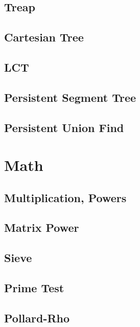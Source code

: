 \subsection{Treap}
\raggedbottom
\hrulefill
\subsection{Cartesian Tree}
\raggedbottom
\hrulefill
\subsection{LCT}
\raggedbottom
\hrulefill
\subsection{Persistent Segment Tree}
\raggedbottom
\hrulefill
\subsection{Persistent Union Find}
\raggedbottom
\hrulefill

\section{Math}
\subsection{Multiplication, Powers}
\raggedbottom
\hrulefill
\subsection{Matrix Power}
\raggedbottom
\hrulefill
\subsection{Sieve}
\raggedbottom
\hrulefill
\subsection{Prime Test}
\raggedbottom
\hrulefill
\subsection{Pollard-Rho}
\raggedbottom
\hrulefill
